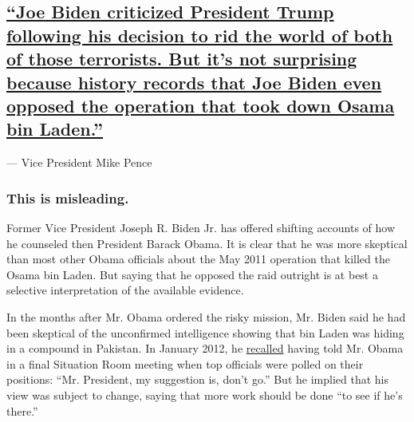 \hypertarget{joe-biden-criticized-president-trump-following-his-decision-to-rid-the-world-of-both-of-those-terrorists-but-its-not-surprising-because-history-records-that-joe-biden-even-opposed-the-operation-that-took-down-osama-bin-laden}{%
\subsection{\texorpdfstring{\protect\hyperlink{joe-biden-criticized-president-trump-following-his-decision-to-rid-the-world-of-both-of-those-terrorists-but-its-not-surprising-}{``Joe
Biden criticized President Trump following his decision to rid the world
of both of those terrorists. But it's not surprising because history
records that Joe Biden even opposed the operation that took down Osama
bin
Laden.''}}{``Joe Biden criticized President Trump following his decision to rid the world of both of those terrorists. But it's not surprising because history records that Joe Biden even opposed the operation that took down Osama bin Laden.''}}\label{joe-biden-criticized-president-trump-following-his-decision-to-rid-the-world-of-both-of-those-terrorists-but-its-not-surprising-because-history-records-that-joe-biden-even-opposed-the-operation-that-took-down-osama-bin-laden}}

--- Vice President Mike Pence

\hypertarget{this-is-misleading}{%
\subsubsection{\texorpdfstring{\textbf{This is
misleading.}}{This is misleading.}}\label{this-is-misleading}}

Former Vice President Joseph R. Biden Jr. has offered shifting accounts
of how he counseled then President Barack Obama. It is clear that he was
more skeptical than most other Obama officials about the May 2011
operation that killed the Osama bin Laden. But saying that he opposed
the raid outright is at best a selective interpretation of the available
evidence.

In the months after Mr. Obama ordered the risky mission, Mr. Biden said
he had been skeptical of the unconfirmed intelligence showing that bin
Laden was hiding in a compound in Pakistan. In January 2012, he
\href{https://abcnews.go.com/blogs/politics/2012/01/joe-biden-advised-against-the-osama-bin-laden-raid}{recalled}
having told Mr. Obama in a final Situation Room meeting when top
officials were polled on their positions: ``Mr. President, my suggestion
is, don't go.'' But he implied that his view was subject to change,
saying that more work should be done ``to see if he's there.''

